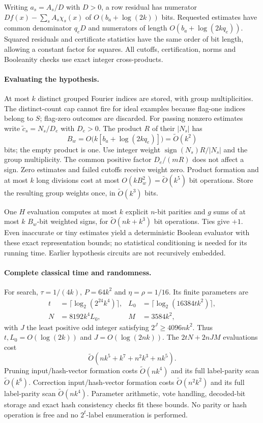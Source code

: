 \documentclass[11pt]{article}
\theoremstyle{remark}\newtheorem{remark}[theorem]{Remark}
\newcommand{\sgn}{\operatorname{sign}}
\begin{document}
Writing $a_s=A_s/D$ with $D>0$, a row residual has numerator $D f(x)-\sum_s A_s\chi_s(x)$ of $O(b_a+\log(2k))$ bits. Requested estimates have common denominator $q_eD$ and numerators of length $O(b_a+\log(2kq_e))$. Squared residuals and certificate statistics have the same order of bit length, allowing a constant factor for squares. All cutoffs, certification, norms and Booleanity checks use exact integer cross-products.

\paragraph{Evaluating the hypothesis.}
At most $k$ distinct grouped Fourier indices are stored, with group multiplicities. The distinct-count cap cannot fire for ideal examples because flag-one indices belong to $S$; flag-zero outcomes are discarded. For passing nonzero estimates write $\widetilde c_s=N_s/D_e$ with $D_e>0$. The product $R$ of their $|N_s|$ has
\[
 B_w=O\bigl(k[b_a+\log(2kq_e)]\bigr)=\widetilde O(k^2)
\]
bits; the empty product is one. Use integer weight $\sgn(N_s)R/|N_s|$ and the group multiplicity. The common positive factor $D_e/(mR)$ does not affect a sign. Zero estimates and failed cutoffs receive weight zero. Product formation and at most $k$ long divisions cost at most $O(kB_w^2)=\widetilde O(k^5)$ bit operations. Store the resulting group weights once, in $\widetilde O(k^3)$ bits.

One $H$ evaluation computes at most $k$ explicit $n$-bit parities and $g$ sums of at most $k$ $B_w$-bit weighted signs, for $\widetilde O(nk+k^3)$ bit operations. Ties give $+1$. Even inaccurate or tiny estimates yield a deterministic Boolean evaluator with these exact representation bounds; no statistical conditioning is needed for its running time. Earlier hypothesis circuits are not recursively embedded.

\paragraph{Complete classical time and randomness.}
For search, $\tau=1/(4k)$, $P=64k^2$ and $\eta=\rho=1/16$. Its finite parameters are
\begin{align*}
 t&=\lceil\log_2(2^{24}k^4)\rceil,&
 L_0&=\lceil\log_2(16384tk^2)\rceil,\\
 N&=8192k^4L_0,& M&=3584k^2,
\end{align*}
with $J$ the least positive odd integer satisfying $2^J\ge4096nk^2$. Thus $t,L_0=O(\log(2k))$ and $J=O(\log(2nk))$. The $2tN+2nJM$ evaluations cost
\[
 \widetilde O(nk^5+k^7+n^2k^3+nk^5).
\]
Pruning input/hash-vector formation costs $\widetilde O(nk^4)$ and its full label-parity scan $\widetilde O(k^6)$. Correction input/hash-vector formation costs $\widetilde O(n^2k^2)$ and its full label-parity scan $\widetilde O(nk^4)$. Parameter arithmetic, vote handling, decoded-bit storage and exact hash consistency checks fit these bounds. No parity or hash operation is free and no $2^t$-label enumeration is performed.
\end{document}
